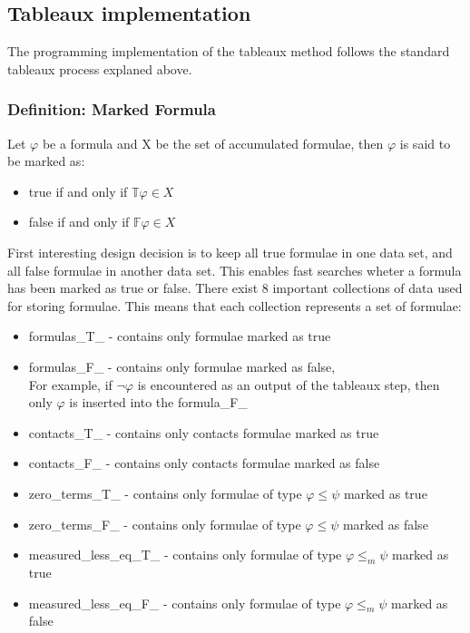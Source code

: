 \documentclass{article}
\begin{document}
	\subsection{Tableaux implementation}
		The programming implementation of the tableaux method follows the standard tableaux process explaned above.

		\subsubsection{Definition: Marked Formula} 
			Let $\varphi$ be a formula and X be the set of accumulated formulae, then $\varphi $ is said to be marked as:
			\begin{itemize}
				\item true if and only if $\mathbb{T}\varphi  \in X $
				\item false if and only if $\mathbb{F}\varphi  \in X $
			\end{itemize}	

		First interesting design decision is to keep all true formulae in one data set, and all false formulae in another data set.
		This enables fast searches wheter a formula has been marked as true or false.
		There exist 8 important collections of data used for storing formulae.
		This means that each collection represents a set of formulae:
		\begin{itemize}
			\item formulas\_T\_ - contains only formulae marked as true
			\item formulas\_F\_ - contains only formulae marked as false, \\
				For example, if $\neg\varphi$ is encountered as an output of the tableaux step, then only $\varphi$ is inserted into the formula\_F\_
			\item contacts\_T\_ - contains only contacts formulae marked as true
			\item contacts\_F\_ - contains only contacts formulae marked as false
			\item zero\_terms\_T\_ - contains only formulae of type $\varphi \le \psi$ marked as true
			\item zero\_terms\_F\_ - contains only formulae of type $\varphi \le \psi$ marked as false
			\item measured\_less\_eq\_T\_ - contains only formulae of type $\varphi \le_m \psi$ marked as true
			\item measured\_less\_eq\_F\_ - contains only formulae of type $\varphi \le_m \psi$ marked as false
		\end{itemize}
	\newpage
\end{document}
